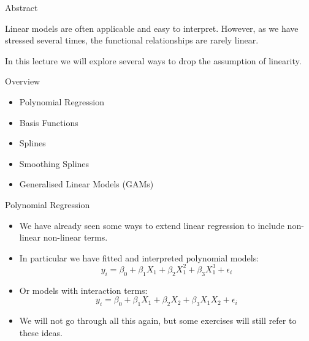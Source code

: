 \documentclass[mathserif, aspectratio=169]{beamer}
\subtitle{\bfseries%
  {Beyond Linearity}\\%
  {\tiny\it Polynomial Regression, Basis Functions, Splines, Generalised Additive Models}\\%
}
\begin{document}


\begin{frame}{Abstract}
	\begin{blurb}
		Linear models are often applicable and easy to interpret. However, as
		we have stressed several times, the  functional relationships
		are rarely linear.

		In this lecture we will explore several ways to drop the assumption
		of linearity.
	\end{blurb}
\end{frame}

\begin{frame}{Overview}
	\begin{itemize}
		\item Polynomial Regression
		\item Basis Functions
		\item Splines
		\item Smoothing Splines
		\item Generalised Linear Models (GAMs)
	\end{itemize}
\end{frame}

\begin{frame}{Polynomial Regression}
	\begin{itemize}
		\item We have already seen some ways to extend linear regression to include
			non-linear non-linear terms.
		\item In particular we have fitted and interpreted polynomial models:
			\[
				y_i = \beta_0 + \beta_1 X_1 + \beta_2 X_1^2 + \beta_3 X_1^3 + \epsilon_i
			\]
		\item Or models with interaction terms:
			\[
				y_i = \beta_0 + \beta_1 X_1 + \beta_2 X_2 + \beta_3 X_1 X_2 + \epsilon_i
			\]
		\item We will not go through all this again, but some exercises will still refer
			to these ideas.
	\end{itemize}
\end{frame}
\end{document}
